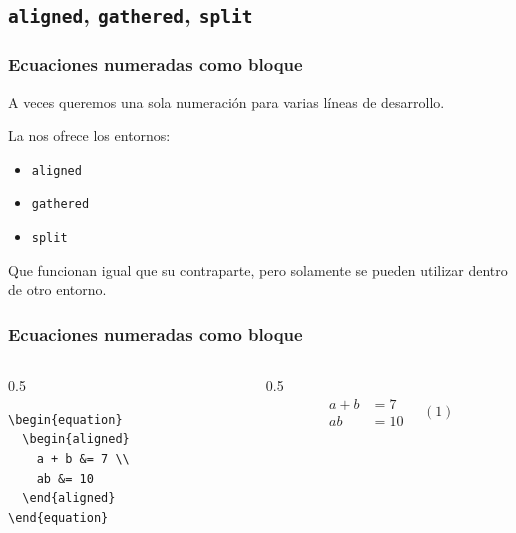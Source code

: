 \documentclass[12pt,aspectratio=169,ignorenonframetext]{ltxbeamer}
\begin{document}
\subsection{\texttt{aligned}, \texttt{gathered}, \texttt{split}}

\begin{frame}[fragile]
\frametitle{Ecuaciones numeradas como bloque}

A veces queremos una sola numeración para varias líneas de desarrollo.

La  nos ofrece los entornos:

\begin{itemize}
    \item \texttt{aligned} 
    \item \texttt{gathered} 
    \item \texttt{split} 
\end{itemize}

\pause

Que funcionan igual que su contraparte, pero solamente se pueden utilizar dentro de otro entorno.
\end{frame}

\begin{frame}[fragile]
\frametitle{Ecuaciones numeradas como bloque}

\begin{columns}
    \begin{column}{0.5\textwidth}
        \begin{verbatim}
\begin{equation}
  \begin{aligned}
    a + b &= 7 \\
    ab &= 10
  \end{aligned}
\end{equation}
        \end{verbatim}
    \end{column}

    \begin{column}{0.5\textwidth}
        \begin{displaymath}
            \begin{aligned}
                a + b &= 7 \\
                ab &= 10
            \end{aligned}
            \quad (1)
        \end{displaymath}
    \end{column}
\end{columns}
\end{frame}
\end{document}
